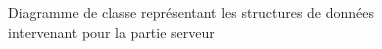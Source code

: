 \documentclass[a4paper]{article}
\begin{document}
\begin{figure}[H]
  \vspace*{-3cm}
   \caption{\label{3} Diagramme de classe représentant les structures de données intervenant pour la partie serveur}
\end{figure}
\end{document}

